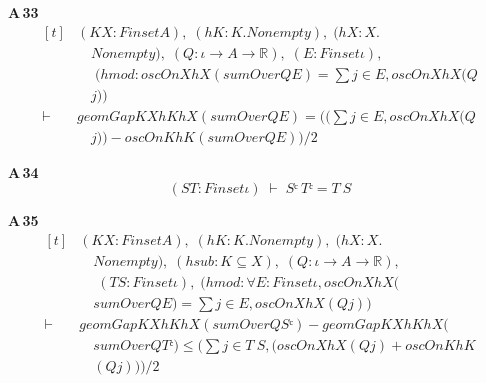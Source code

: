\noindent\textbf{A\,33}\quad{}
{\footnotesize\[ \begin{aligned}[t]
&(\mathit{K} \mathit{X} : \mathit{Finset} \mathit{A}),\; (\mathit{hK} : \mathit{K}.\mathit{Nonempty}),\; (\mathit{hX} : \mathit{X}.\\
&\quad \mathit{Nonempty}),\; (\mathit{Q} : \iota \to \mathit{A} \to \mathbb{R} ),\; (\mathit{E} : \mathit{Finset} \iota ),\\
&\quad \; (\mathit{hmod} : \mathit{oscOn} \mathit{X} \mathit{hX} (\mathit{sumOver} \mathit{Q} \mathit{E}) = \textstyle\sum \mathit{j} \in \mathit{E}, \mathit{oscOn} \mathit{X} \mathit{hX} (\mathit{Q}\\
&\quad \mathit{j}))\\
\vdash\;&\mathit{geomGap} \mathit{K} \mathit{X} \mathit{hK} \mathit{hX} (\mathit{sumOver} \mathit{Q} \mathit{E}) = ((\textstyle\sum \mathit{j} \in \mathit{E}, \mathit{oscOn} \mathit{X} \mathit{hX} (\mathit{Q}\\
&\quad \mathit{j})) - \mathit{oscOn} \mathit{K} \mathit{hK} (\mathit{sumOver} \mathit{Q} \mathit{E})) / 2
\end{aligned} \]}

\noindent\textbf{A\,34}\quad{}
{\footnotesize\[ (\mathit{S} \mathit{T} : \mathit{Finset} \iota ) \;\vdash\; \mathit{Sᶜ} \ \mathit{Tᶜ} = \mathit{T} \ \mathit{S} \]}

\noindent\textbf{A\,35}\quad{}
{\footnotesize\[ \begin{aligned}[t]
&(\mathit{K} \mathit{X} : \mathit{Finset} \mathit{A}),\; (\mathit{hK} : \mathit{K}.\mathit{Nonempty}),\; (\mathit{hX} : \mathit{X}.\\
&\quad \mathit{Nonempty}),\; (\mathit{hsub} : \mathit{K} \subseteq \mathit{X}),\; (\mathit{Q} : \iota \to \mathit{A} \to \mathbb{R} ),\\
&\quad \; (\mathit{T} \mathit{S} : \mathit{Finset} \iota ),\; (\mathit{hmod} : \forall \mathit{E} : \mathit{Finset} \iota , \mathit{oscOn} \mathit{X} \mathit{hX} (\\
&\quad \mathit{sumOver} \mathit{Q} \mathit{E}) = \textstyle\sum \mathit{j} \in \mathit{E}, \mathit{oscOn} \mathit{X} \mathit{hX} (\mathit{Q} \mathit{j}))\\
\vdash\;&\mathit{geomGap} \mathit{K} \mathit{X} \mathit{hK} \mathit{hX} (\mathit{sumOver} \mathit{Q} \mathit{Sᶜ}) - \mathit{geomGap} \mathit{K} \mathit{X} \mathit{hK} \mathit{hX} (\\
&\quad \mathit{sumOver} \mathit{Q} \mathit{Tᶜ}) \leq (\textstyle\sum \mathit{j} \in \mathit{T} \ \mathit{S}, (\mathit{oscOn} \mathit{X} \mathit{hX} (\mathit{Q} \mathit{j}) + \mathit{oscOn} \mathit{K} \mathit{hK}\\
&\quad (\mathit{Q} \mathit{j}))) / 2
\end{aligned} \]}

